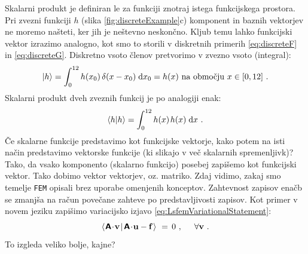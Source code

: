 Skalarni produkt je definiran le za funkciji znotraj istega funkcijskega prostora. Pri zvezni funkciji $h$ (slika \ref{fig:discreteExample}c) komponent in baznih vektorjev ne moremo našteti, ker jih je neštevno neskončno. Kljub temu lahko funkcijski vektor izrazimo analogno, kot smo to storili v diskretnih primerih \eqref{eq:discreteF} in \eqref{eq:discreteG}. Diskretno vsoto členov pretvorimo v zvezno vsoto (integral):
\begin{equation}
   \ket{h} = \int_{0}^{12} h(x_0) \mkern3mu \delta(x-x_0) \mkern5mu \text{d}x_0 = h(x) \text{ na območju } x \in [0, 12] \ .
\end{equation}
Skalarni produkt dveh zveznih funkcij je po analogiji enak:
\begin{equation}
   \bra{h}\ket{h} =
   \int_0^{12} h(x) \mkern2mu h(x) \mkern5mu \text{d}x \ .
\end{equation}
Če skalarne funkcije predstavimo kot funkcijske vektorje, kako potem na isti način predstavimo vektorske funkcije (ki slikajo v več skalarnih spremenljivk)? Tako, da vsako komponento (skalarno funkcijo) posebej zapišemo kot funkcijski vektor. Tako dobimo vektor vektorjev, oz. matriko. Zdaj vidimo, zakaj smo temelje \texttt{FEM} opisali brez uporabe omenjenih konceptov. Zahtevnost zapisov enačb se zmanjša na račun povečane zahteve po predstavljivosti zapisov. Kot primer v novem jeziku zapišimo variacijsko izjavo \eqref{eq:LsfemVariationalStatement}:
\begin{equation}
   \bra{\mkern1mu \bm{\mathsf{A}} \! \cdot \! \mathbf{v} \mkern2mu}\ket{\mkern2mu \bm{\mathsf{A}} \! \cdot \! \mathbf{u} - \mathbf{f}\mkern1mu} \ = \,
   0 \ , \hspace{5mm} \forall \mathbf{v} \ .
   \label{eq:LsfemVariationalStatementNew}
\end{equation}
To izgleda veliko bolje, kajne?

